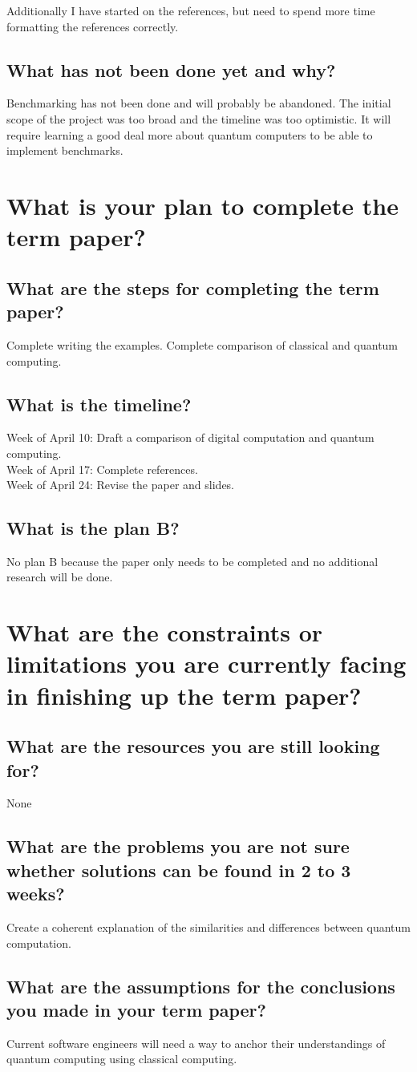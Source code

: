\documentclass{article}
\begin{document}
Additionally I have started on the references, but need to spend more time formatting the references correctly. 

\subsection{What has not been done yet and why?}
Benchmarking has not been done and will probably be abandoned. The initial scope of the project was too broad and the timeline was too optimistic. It will require learning a good deal more about quantum computers to be able to implement benchmarks.

\section{What is your plan to complete the term paper?}
\subsection{What are the steps for completing the term paper?}
Complete writing the examples. Complete comparison of classical and quantum computing. 

\subsection{What is the timeline?}
Week of April 10: Draft a comparison of digital computation and quantum computing. \\
Week of April 17: Complete references. \\
Week of April 24: Revise the paper and slides. \\

\subsection{What is the plan B?}
No plan B because the paper only needs to be completed and no additional research will be done.

\section{What are the constraints or limitations you are currently facing in finishing up the term paper?}
\subsection{What are the resources you are still looking for?}
None

\subsection{What are the problems you are not sure whether solutions can be found in 2 to 3 weeks?}
Create a coherent explanation of the similarities and differences between quantum computation. 

\subsection{What are the assumptions for the conclusions you made in your term paper?}
Current software engineers will need a way to anchor their understandings of quantum computing using classical computing. 
\end{document}
